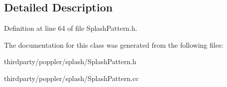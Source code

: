 \subsection{Detailed Description}


Definition at line 64 of file Splash\+Pattern.\+h.



The documentation for this class was generated from the following files\+:\begin{DoxyCompactItemize}
\item 
thirdparty/poppler/splash/Splash\+Pattern.\+h\item 
thirdparty/poppler/splash/Splash\+Pattern.\+cc\end{DoxyCompactItemize}
